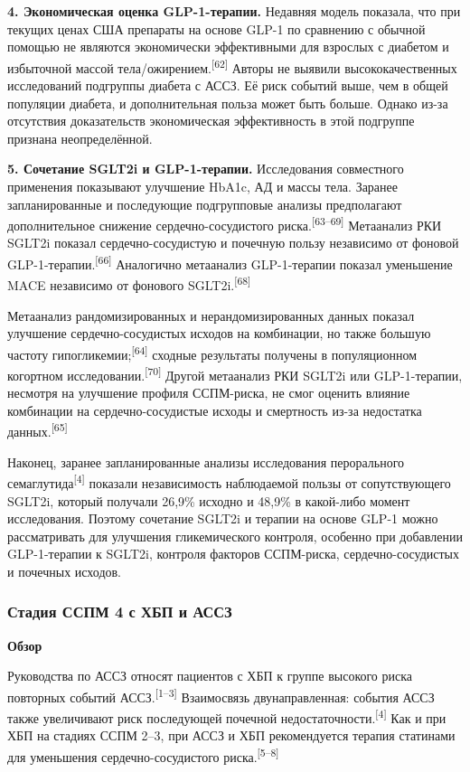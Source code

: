 \documentclass[11pt,a4paper]{article}
\newcommand{\src}[1]{\textsuperscript{[#1]}}
\newcommand{\heading}[1]{\par\medskip\textbf{#1}\par}
\begin{document}
\textbf{4. Экономическая оценка GLP-1-терапии.} Недавняя модель показала, что при текущих ценах США препараты на основе GLP-1 по сравнению с обычной помощью не являются экономически эффективными для взрослых с диабетом и избыточной массой тела/ожирением.\src{62} Авторы не выявили высококачественных исследований подгруппы диабета с АССЗ. Её риск событий выше, чем в общей популяции диабета, и дополнительная польза может быть больше. Однако из-за отсутствия доказательств экономическая эффективность в этой подгруппе признана неопределённой.

\textbf{5. Сочетание SGLT2i и GLP-1-терапии.} Исследования совместного применения показывают улучшение HbA1c, АД и массы тела. Заранее запланированные и последующие подгрупповые анализы предполагают дополнительное снижение сердечно-сосудистого риска.\src{63--69} Метаанализ РКИ SGLT2i показал сердечно-сосудистую и почечную пользу независимо от фоновой GLP-1-терапии.\src{66} Аналогично метаанализ GLP-1-терапии показал уменьшение MACE независимо от фонового SGLT2i.\src{68}

Метаанализ рандомизированных и нерандомизированных данных показал улучшение сердечно-сосудистых исходов на комбинации, но также большую частоту гипогликемии;\src{64} сходные результаты получены в популяционном когортном исследовании.\src{70} Другой метаанализ РКИ SGLT2i или GLP-1-терапии, несмотря на улучшение профиля ССПМ-риска, не смог оценить влияние комбинации на сердечно-сосудистые исходы и смертность из-за недостатка данных.\src{65}

Наконец, заранее запланированные анализы исследования перорального сема\-глутида\src{4} показали независимость наблюдаемой пользы от сопутствующего SGLT2i, который получали 26,9\% исходно и 48,9\% в какой-либо момент исследования. Поэтому сочетание SGLT2i и терапии на основе GLP-1 можно рассматривать для улучшения гликемического контроля, особенно при добавлении GLP-1-терапии к SGLT2i, контроля факторов ССПМ-риска, сердечно-сосудистых и почечных исходов.

\subsubsection{Стадия ССПМ 4 с ХБП и АССЗ}
\heading{Обзор}
Руководства по АССЗ относят пациентов с ХБП к группе высокого риска повторных событий АССЗ.\src{1--3} Взаимосвязь двунаправленная: события АССЗ также увеличивают риск последующей почечной недостаточности.\src{4} Как и при ХБП на стадиях ССПМ 2--3, при АССЗ и ХБП рекомендуется терапия статинами для уменьшения сердечно-сосудистого риска.\src{5--8}
\end{document}
